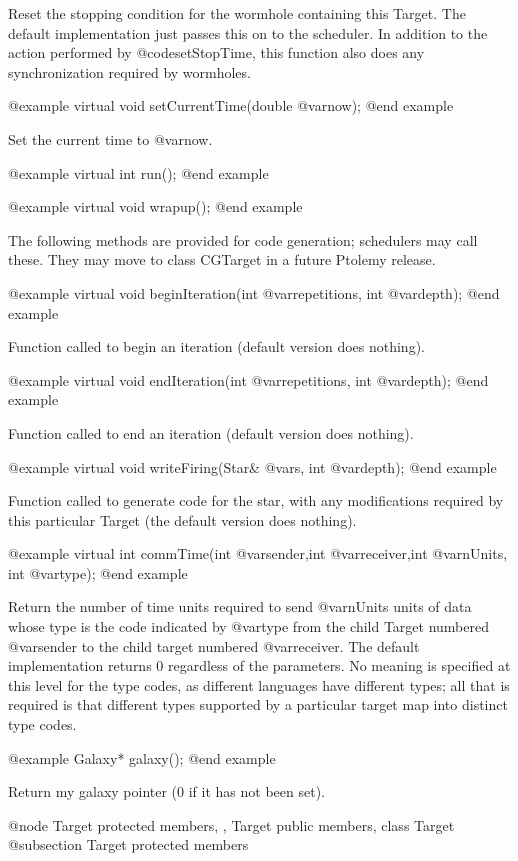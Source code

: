 Reset the stopping condition for the wormhole containing this Target.
The default implementation just passes this on to the scheduler.  In
addition to the action performed by @code{setStopTime}, this function
also does any synchronization required by wormholes.

@example
virtual void setCurrentTime(double @var{now});
@end example

Set the current time to @var{now}.

@example
virtual int run();
@end example

@example
virtual void wrapup();
@end example

The following methods are provided for code generation; schedulers may
call these.  They may move to class CGTarget in a future Ptolemy release.

@example
virtual void beginIteration(int @var{repetitions}, int @var{depth});
@end example

Function called to begin an iteration (default version
does nothing).

@example
virtual void endIteration(int @var{repetitions}, int @var{depth});
@end example

Function called to end an iteration (default version
does nothing).

@example
virtual void writeFiring(Star& @var{s}, int @var{depth});
@end example

Function called to generate code for the star, with any modifications
required by this particular Target (the default version does nothing).

@example
virtual int commTime(int @var{sender},int @var{receiver},int @var{nUnits}, int @var{type});
@end example

Return the number of time units required to send @var{nUnits} units of
data whose type is the code indicated by @var{type} from the child Target
numbered @var{sender} to the child target numbered @var{receiver}.
The default implementation returns 0 regardless of the parameters.
No meaning is specified at this level for the type codes, as different
languages have different types; all that is required is that different
types supported by a particular target map into distinct type codes.

@example
Galaxy* galaxy();
@end example

Return my galaxy pointer (0 if it has not been set).

@node Target protected members,  , Target public members, class Target
@subsection Target protected members

